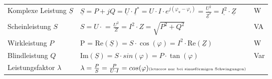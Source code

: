 \medskip
\begin{tabularx}{\linewidth}{lXl}
	Komplexe Leistung $\underline{S}$ & $\underline{S} = P + jQ = \underline{U} \cdot \underline{I}^* = U \cdot I \cdot e^{j(\varphi_u - \varphi_i)} = \frac{\underline{U^2}}{\underline{Z}^*} = \underline{I^2} \cdot \underline{Z}$ & W   \\
	Scheinleistung $S$                & $S = U \cdot$ = $\frac{U^2}{Z} = I^2 \cdot Z = \sqrt{P^2 + Q^2}$                                                                                                                              & VA  \\
	Wirkleistung $P$                  & P = $\text{Re}(\underline{S}) = S \cdot \cos(\varphi) = I^2 \cdot \text{Re}(\underline{Z})$                                                                                                   & W   \\
	Blindleistung $Q$                 & $\text{Im}(\underline{S}) = S \cdot sin(\varphi) = P \cdot \tan(\varphi)$                                                                                                                     & Var \\
	Leistungsfaktor $\lambda$         & $\lambda = \frac{P}{S} = \frac{P}{U \cdot I} = cos(\varphi) \text{\tiny (letzeres nur bei sinusförmigen Schwingungen)}$                                                                       &
\end{tabularx}
